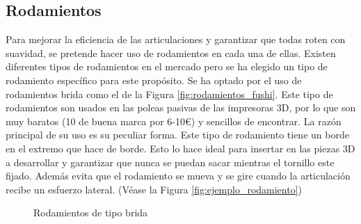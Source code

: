 \subsection{Rodamientos}
Para mejorar la eficiencia de las articulaciones y garantizar que todas roten con suavidad, se pretende hacer uso de rodamientos 
en cada una de ellas. 
Existen diferentes tipos de rodamientos en el mercado pero se ha elegido un tipo de rodamiento específico para este propósito. 
Se ha optado por el uso de rodamientos brida como el de la Figura \ref{fig:rodamientos_fushi}. Este tipo de rodamientos son usados en las poleas pasivas de las impresoras 3D, por lo 
que son muy baratos (10 de buena marca por 6-10€) y sencillos de encontrar. La razón principal de su uso es su peculiar forma. Este tipo 
de rodamiento tiene un borde en el extremo que hace de borde. Esto lo hace ideal para insertar en las piezas 3D a desarrollar y garantizar 
que nunca se puedan sacar mientras el tornillo este fijado. Además evita que el rodamiento se mueva y se gire cuando la articulación 
recibe un esfuerzo lateral. (Véase la Figura \ref{fig:ejemplo_rodamiento})

\begin{figure} [ht!]
  \centering  
  \hspace{0.5cm}
  \caption{Rodamientos de tipo brida}
\end{figure}\ 


